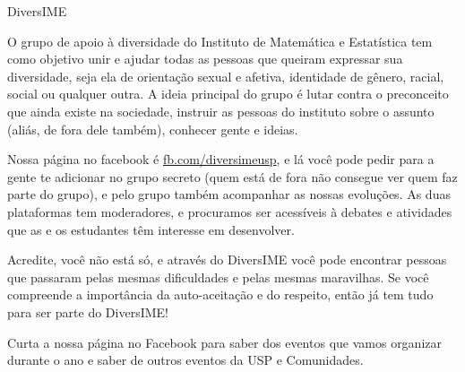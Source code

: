 \begin{subsecao}{DiversIME}


O grupo de apoio à diversidade do Instituto de Matemática e Estatística tem como
objetivo unir e ajudar todas as pessoas que queiram expressar sua diversidade,
seja ela de orientação sexual e afetiva, identidade de gênero, racial, social ou
qualquer outra. A ideia principal do grupo é lutar contra o preconceito que
ainda existe na sociedade, instruir as pessoas do instituto sobre o assunto
(aliás, de fora dele também), conhecer gente e ideias.

Nossa página no facebook é \url{fb.com/diversimeusp}, e lá você pode pedir para
a gente te adicionar no grupo secreto (quem está de fora não consegue ver quem
faz parte do grupo), e pelo grupo também acompanhar as nossas evoluções. As duas 
plataformas tem moderadores, e procuramos ser acessíveis à debates e atividades 
que as e os estudantes têm interesse em desenvolver. 

Acredite, você não está só, e através do DiversIME você pode encontrar pessoas
que passaram pelas mesmas dificuldades e pelas mesmas maravilhas. Se você
compreende a importância da auto-aceitação e do respeito, então já tem tudo para
ser parte do DiversIME!

Curta a nossa página no Facebook para saber dos eventos que vamos organizar 
durante o ano e saber de outros eventos da USP e Comunidades. 

\end{subsecao}
